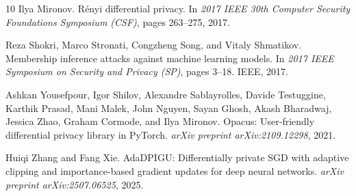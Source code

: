 \documentclass[11pt,a4paper]{article}
\begin{document}
\begin{thebibliography}{10}
Ilya Mironov.
\newblock R\'{e}nyi differential privacy.
\newblock In \emph{2017 IEEE 30th Computer Security Foundations Symposium (CSF)}, pages 263--275, 2017.

Reza Shokri, Marco Stronati, Congzheng Song, and Vitaly Shmatikov.
\newblock Membership inference attacks against machine learning models.
\newblock In \emph{2017 IEEE Symposium on Security and Privacy (SP)}, pages 3--18. IEEE, 2017.

Ashkan Yousefpour, Igor Shilov, Alexandre Sablayrolles, Davide Testuggine, Karthik Prasad, Mani Malek, John Nguyen, Sayan Ghosh, Akash Bharadwaj, Jessica Zhao, Graham Cormode, and Ilya Mironov.
\newblock Opacus: User-friendly differential privacy library in {PyTorch}.
\newblock \emph{arXiv preprint arXiv:2109.12298}, 2021.

Huiqi Zhang and Fang Xie.
\newblock AdaDPIGU: Differentially private SGD with adaptive clipping and importance-based gradient updates for deep neural networks.
\newblock \emph{arXiv preprint arXiv:2507.06525}, 2025.

\end{thebibliography}
\end{document}
